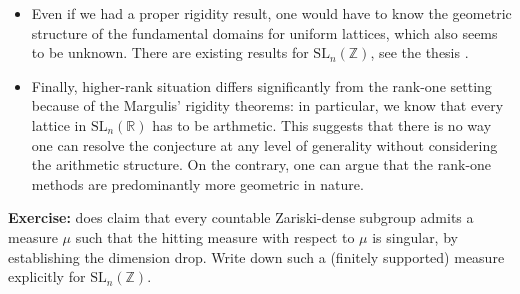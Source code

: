 \documentclass[11pt]{amsart}
\theoremstyle{definition}
\begin{document}
\begin{itemize}
		\item Even if we had a proper rigidity result, one would have to know the geometric structure of the fundamental domains for uniform lattices, which also seems to be unknown. There are existing results for $\text{SL}_n(\mathbb{Z})$, see the thesis \cite{gisele}.
		\item Finally, higher-rank situation differs significantly from the rank-one setting because of the Margulis' rigidity theorems: in particular, we know that every lattice in $\text{SL}_n(\mathbb{R})$ has to be arthmetic. This suggests that there is no way one can resolve the conjecture at any level of generality without considering the arithmetic structure. On the contrary, one can argue that the rank-one methods are predominantly more geometric in nature.
	\end{itemize}
	
	\textbf{Exercise:} \cite{kaimanovich2011matrix} does claim that every countable Zariski-dense subgroup admits a measure $\mu$ such that the hitting measure with respect to $\mu$ is singular, by establishing the dimension drop. Write down such a (finitely supported) measure explicitly for $\text{SL}_n(\mathbb{Z})$. 
	
	
	\printbibliography
	
\end{document}
